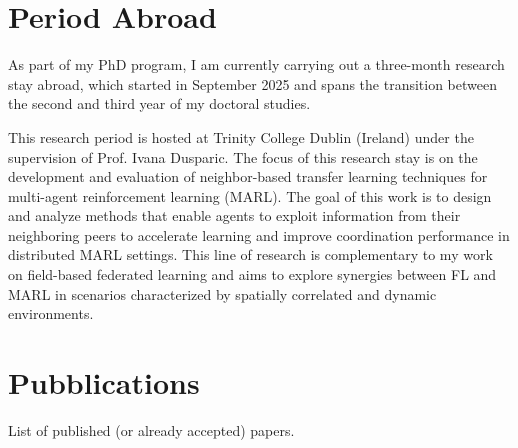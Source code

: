 \documentclass[runningheads]{llncs}
\begin{document}
\section{Period Abroad}
As part of my PhD program, I am currently carrying out a three-month research stay abroad, 
 which started in September 2025 and spans the transition between 
 the second and third year of my doctoral studies.

This research period is hosted at Trinity College Dublin (Ireland) 
 under the supervision of Prof. Ivana Dusparic. 
% 
The focus of this research stay is on the development and evaluation of neighbor-based transfer 
 learning techniques for multi-agent reinforcement learning (MARL).
%
The goal of this work is to design and analyze methods that enable agents to exploit information 
 from their neighboring peers to accelerate learning and improve coordination performance 
 in distributed MARL settings. 
% 
This line of research is complementary to my work on field-based federated learning and aims 
 to explore synergies between FL and MARL in scenarios characterized by spatially correlated and dynamic environments.

\section{Pubblications}
List of published (or already accepted) papers.
\end{document}
